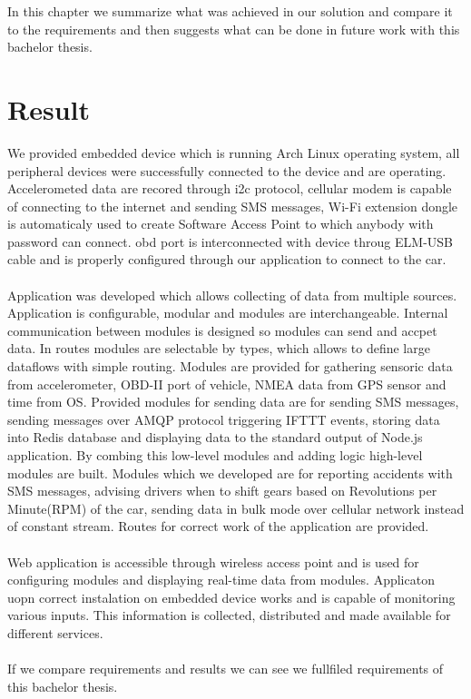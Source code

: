In this chapter we summarize what was achieved in our solution and compare it to the requirements and then suggests what can be done in future work with this bachelor thesis.
\section{Result} %
\label{sec:result}
We provided embedded device which is running Arch Linux operating system, all peripheral devices were successfully connected to the device and are operating. Accelerometed data are recored through \gls{i2c} protocol, cellular modem is capable of connecting to the internet and sending SMS messages, Wi-Fi extension dongle is automaticaly used to create Software Access Point to which anybody with password can connect. \gls{obd} port is interconnected with device throug ELM-USB cable and is properly configured through our application to connect to the car.\\\\
Application was developed which allows collecting of data from multiple sources. Application is configurable, modular and modules are interchangeable. Internal communication between modules is designed so modules can send and accpet data. In routes modules are selectable by types, which allows to define large dataflows with simple routing. Modules are provided for gathering sensoric data from accelerometer, OBD-II port of vehicle, NMEA data from GPS sensor and time from OS. Provided modules for sending data are for sending SMS messages, sending messages over AMQP protocol triggering IFTTT events, storing data into Redis database and displaying data to the standard output of Node.js application. By combing this low-level modules and adding logic high-level modules are built. Modules which we developed are for reporting accidents with SMS messages, advising drivers when to shift gears based on Revolutions per Minute(RPM) of the car, sending data in bulk mode over cellular network instead of constant stream. Routes for correct work of the application are provided.\\\\
Web application is accessible through wireless access point and is used for configuring modules and displaying real-time data from modules. Applicaton uopn correct instalation on embedded device works and is capable of monitoring various inputs. This information is collected, distributed and made available for different services.\\\\
If we compare requirements and results we can see we fullfiled requirements of this bachelor thesis.
